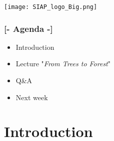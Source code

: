\documentclass[xcolor=x11names,compress, aspectratio=169]{beamer}
\renewcommand{\(}{\begin{columns}}
\renewcommand{\)}{\end{columns}}
\newcommand{\<}[1]{\begin{column}{#1}}
\renewcommand{\>}{\end{column}}
\begin{document}


\begin{frame}
\Large{ \color{siap}{Machine Learning for Official Statistics and SDGs}}

\hspace{1cm}


\hspace{2cm}
\begin{center}

\texttt{[image: SIAP\_logo\_Big.png]}

\end{center}
\end{frame}




\begin{frame} %
\frametitle{\textcolor{brique}{[-  \textbf{Agenda} -]}}
\begin{itemize}[<+-|alert@+>]
   \item Introduction
   \item Lecture "\textit{From Trees to Forest}"
   \item Q\&A
   \item Next week
\end{itemize}
\end{frame}


\section{Introduction}
\end{document}
